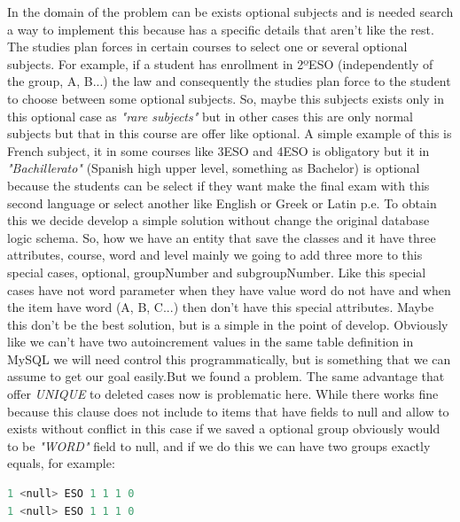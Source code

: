 In the domain of the problem can be exists optional subjects and is
needed search a way to implement this because has a specific details
that aren't like the rest.
\intro
The studies plan forces in certain courses to select one or several
optional subjects. For example, if a student has enrollment in 2ºESO
(independently of the group, A, B...) the law and consequently the
studies plan force to the student to choose between some optional
subjects. So, maybe this subjects exists only in this optional case
as \textit{"rare subjects"} but in other cases this are only normal subjects
but that in this course are offer like optional.
\intro
A simple example of this is French subject, it in some courses like
3ESO and 4ESO is obligatory but it in \textit{"Bachillerato"} (Spanish high upper level, something as Bachelor)
is optional because the students can be select if they want make the
final exam with this second language or select another like English
or Greek or Latin p.e.
\intro
To obtain this we decide develop a simple solution without change
the original database logic schema. So, how we have an entity that
save the classes and it have three attributes, course, word and level
mainly we going to add three more to this special cases, optional,
groupNumber and subgroupNumber. Like this special cases have not word
parameter when they have value word do not have and when the item have
word (A, B, C...) then don't have this special attributes.
\intro
Maybe this don't be the best solution, but is a simple in the point
of develop.
Obviously like we can't have two autoincrement values in the same
table definition in MySQL we will need control this programmatically,
but is something that we can assume to get our goal easily.But we found a problem.
\intro
The same advantage that offer \textit{UNIQUE} to deleted cases now is problematic
here. While there works fine because this clause does not include to items that
have fields to null and allow to exists without conflict in this case if we saved
a optional group obviously would to be \textit{"WORD"} field to null, and if we
do this we can have two groups exactly equals, for example:

\begin{lstlisting}[language=python,frame=none]
1 <null> ESO 1 1 1 0
1 <null> ESO 1 1 1 0
\end{lstlisting}

